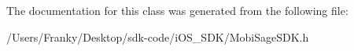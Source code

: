 \-The documentation for this class was generated from the following file\-:\begin{DoxyCompactItemize}
\item 
/\-Users/\-Franky/\-Desktop/sdk-\/code/i\-O\-S\-\_\-\-S\-D\-K/\-Mobi\-Sage\-S\-D\-K.\-h\end{DoxyCompactItemize}
